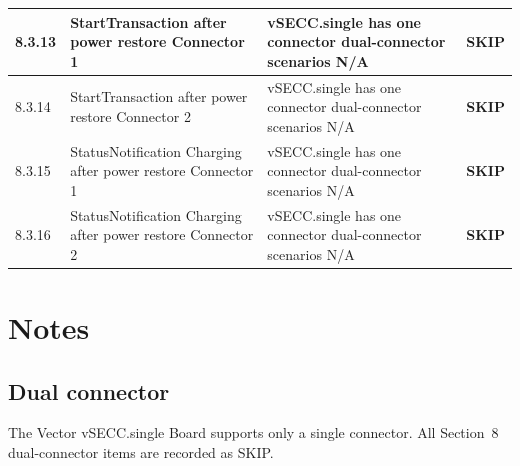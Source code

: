 \documentclass[10pt, a4paper]{article}
\begin{document}
\begin{longtable}{|L{1cm}|L{5.5cm}|M{7cm}|C{1.8cm}|}
\hline
\small 8.3.13 & \small StartTransaction after power restore  Connector 1 & vSECC.single has one connector  dual-connector scenarios N/A & \textcolor{skipgray}{\textbf{SKIP}} \\
\hline
\small 8.3.14 & \small StartTransaction after power restore  Connector 2 & vSECC.single has one connector  dual-connector scenarios N/A & \textcolor{skipgray}{\textbf{SKIP}} \\
\hline
\small 8.3.15 & \small StatusNotification Charging after power restore  Connector 1 & vSECC.single has one connector  dual-connector scenarios N/A & \textcolor{skipgray}{\textbf{SKIP}} \\
\hline
\small 8.3.16 & \small StatusNotification Charging after power restore  Connector 2 & vSECC.single has one connector  dual-connector scenarios N/A & \textcolor{skipgray}{\textbf{SKIP}} \\
\hline
\end{longtable}
\normalsize

\section{Notes}

\subsection*{Dual connector}
The Vector vSECC.single Board supports only a single connector.
All Section~8 dual-connector items are recorded as SKIP.
\end{document}
